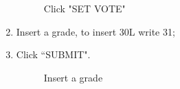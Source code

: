 \documentclass[ManualeUtente]{subfiles}
\begin{document}
\begin{enumerate}
\begin{figure}[H]
		\caption{Click "SET VOTE"}
		\label{fig:Click "SET VOTE"}
	\end{figure}
	\item Insert a grade, to insert 30L write 31;
	\item Click \textquotedblleft SUBMIT".
	\begin{figure}[H]
		\centering
		\caption{Insert a grade}
		\label{fig:Insert a grade}
	\end{figure}
\end{enumerate}
\end{document}
